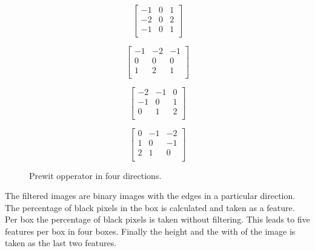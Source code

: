 \begin{figure}[ht]
  \begin{minipage}{0.24\linewidth}
    \centering
    \[\left[\begin{array}{ccc}
    -1 & 0 & 1\\
    -2 & 0 & 2\\
    -1 & 0 & 1\\
    \end{array}\right]\]
  \end{minipage}%
    \begin{minipage}{0.24\linewidth}
    \centering
    \[\left[\begin{array}{ccc}
    -1 & -2 & -1\\
    0 & 0 & 0\\
    1 & 2 & 1\\
    \end{array}\right]\]
  \end{minipage}%
    \begin{minipage}{0.24\linewidth}
    \centering
    \[\left[\begin{array}{ccc}
    -2 & -1 & 0\\
    -1 & 0 & 1\\
    0 & 1 & 2\\
    \end{array}\right]\]
  \end{minipage}%
    \begin{minipage}{0.24\linewidth}
    \centering
    \[\left[\begin{array}{ccc}
    0 & -1 & -2\\
    1 & 0 & -1\\
    2 & 1 & 0\\
    \end{array}\right]\]
  \end{minipage}%
  \caption{Prewit opperator in four directions.}
  \label{mat:method:prewit:2d}
\end{figure}



The filtered images are binary images with the edges in a particular direction. The percentage of black pixels in the box is calculated and taken as a feature. Per box the percentage of black pixels is taken without filtering. This leads to five features per box in four boxes. Finally the height and the with of the image is taken as the last two features.

